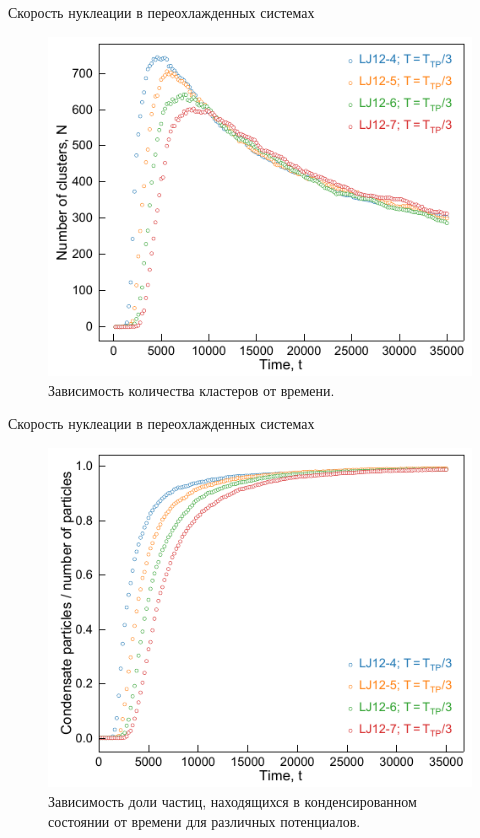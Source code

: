 \documentclass{beamer}
\begin{document}
\begin{frame}{Скорость нуклеации в переохлажденных системах}
\footnotesize{
\begin{figure}[!t]
    \centering
    \includegraphics[width=0.7\linewidth]{countCluster.pdf}
    \caption{Зависимость количества кластеров от времени.}
    \label{countCluster}
\end{figure}
}

\end{frame}






\begin{frame}{Скорость нуклеации в переохлажденных системах}
\footnotesize{
\begin{figure}[!t]
    \centering
    \includegraphics[width=0.7\linewidth]{countParticles.pdf}
    \caption{Зависимость доли частиц, находящихся в конденсированном состоянии от времени для различных потенциалов.}
    \label{countParticles}
\end{figure}
}

\end{frame}
\end{document}
